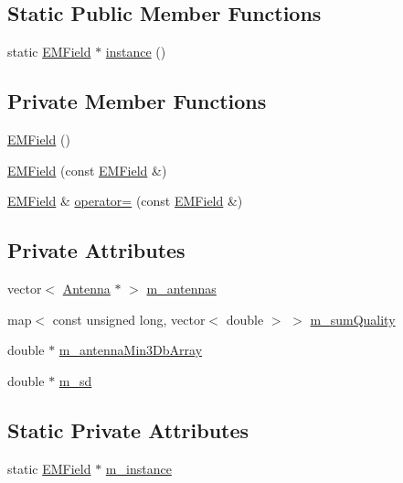 \subsection*{Static Public Member Functions}
\begin{DoxyCompactItemize}
\item 
static \hyperlink{class_e_m_field}{E\+M\+Field} $\ast$ \hyperlink{class_e_m_field_acbadbede116ac320398cbfcd19e90ec7}{instance} ()
\end{DoxyCompactItemize}
\subsection*{Private Member Functions}
\begin{DoxyCompactItemize}
\item 
\hyperlink{class_e_m_field_a054f389cfa853008f32c02d874aa4d58}{E\+M\+Field} ()
\item 
\hyperlink{class_e_m_field_a7760631ded36ba2c5a918c97a1cc93e9}{E\+M\+Field} (const \hyperlink{class_e_m_field}{E\+M\+Field} \&)
\item 
\hyperlink{class_e_m_field}{E\+M\+Field} \& \hyperlink{class_e_m_field_ad35e4754cad2016d7df1b8ac45540b35}{operator=} (const \hyperlink{class_e_m_field}{E\+M\+Field} \&)
\end{DoxyCompactItemize}
\subsection*{Private Attributes}
\begin{DoxyCompactItemize}
\item 
vector$<$ \hyperlink{class_antenna}{Antenna} $\ast$ $>$ \hyperlink{class_e_m_field_ab74a3bde70b66fd033bde6c25345a755}{m\+\_\+antennas}
\item 
map$<$ const unsigned long, vector$<$ double $>$ $>$ \hyperlink{class_e_m_field_a18e5a4d972d888c5da458e30e426c7ae}{m\+\_\+sum\+Quality}
\item 
double $\ast$ \hyperlink{class_e_m_field_a96c4c7bc39c2f8afea0dca3280fe145c}{m\+\_\+antenna\+Min3\+Db\+Array}
\item 
double $\ast$ \hyperlink{class_e_m_field_ac2142eafd5b82e43437a8047565f619c}{m\+\_\+sd}
\end{DoxyCompactItemize}
\subsection*{Static Private Attributes}
\begin{DoxyCompactItemize}
\item 
static \hyperlink{class_e_m_field}{E\+M\+Field} $\ast$ \hyperlink{class_e_m_field_a3a75e412fa15cfab78ce64dfbb8af52d}{m\+\_\+instance}
\end{DoxyCompactItemize}


